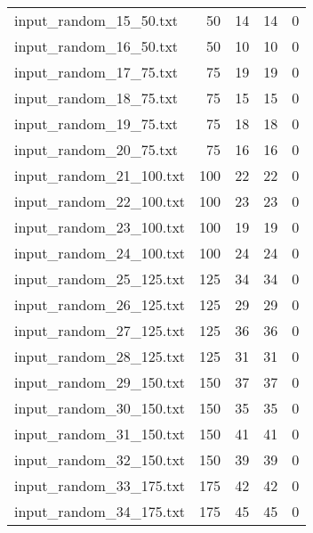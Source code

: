 \begin{table}[H]
\begin{tabular}{lrrrr}
     input\_random\_15\_50.txt  &      50 &        14 &                 14 &               0 \\
     input\_random\_16\_50.txt  &      50 &        10 &                 10 &               0 \\
     input\_random\_17\_75.txt  &      75 &        19 &                 19 &               0 \\
     input\_random\_18\_75.txt  &      75 &        15 &                 15 &               0 \\
     input\_random\_19\_75.txt  &      75 &        18 &                 18 &               0 \\
     input\_random\_20\_75.txt  &      75 &        16 &                 16 &               0 \\
     input\_random\_21\_100.txt &     100 &        22 &                 22 &               0 \\
     input\_random\_22\_100.txt &     100 &        23 &                 23 &               0 \\
     input\_random\_23\_100.txt &     100 &        19 &                 19 &               0 \\
     input\_random\_24\_100.txt &     100 &        24 &                 24 &               0 \\
     input\_random\_25\_125.txt &     125 &        34 &                 34 &               0 \\
     input\_random\_26\_125.txt &     125 &        29 &                 29 &               0 \\
     input\_random\_27\_125.txt &     125 &        36 &                 36 &               0 \\
     input\_random\_28\_125.txt &     125 &        31 &                 31 &               0 \\
     input\_random\_29\_150.txt &     150 &        37 &                 37 &               0 \\
     input\_random\_30\_150.txt &     150 &        35 &                 35 &               0 \\
     input\_random\_31\_150.txt &     150 &        41 &                 41 &               0 \\
     input\_random\_32\_150.txt &     150 &        39 &                 39 &               0 \\
     input\_random\_33\_175.txt &     175 &        42 &                 42 &               0 \\
     input\_random\_34\_175.txt &     175 &        45 &                 45 &               0 \\

\end{tabular}
\end{table}
